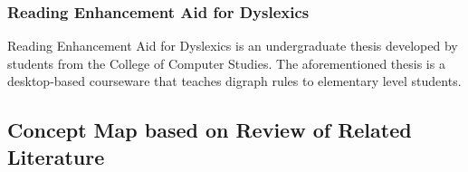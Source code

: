 \documentclass[letterpaper, 12pt, oneside]{book}
\begin{document}
\subsubsection{Reading Enhancement Aid for Dyslexics}
Reading Enhancement Aid for Dyslexics is an undergraduate thesis developed by students from the College of Computer Studies. The aforementioned thesis is a desktop-based courseware that teaches digraph rules to elementary level students.

\subsection{Concept Map based on Review of Related Literature}
\end{document}
